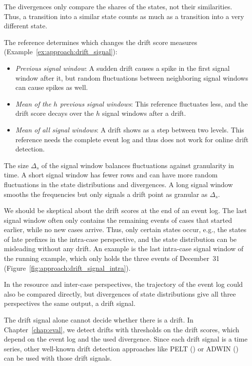 The divergences only compare the shares of the states, not their similarities. Thus, a transition into a similar state counts as much as a transition into a very different state.

The reference determines which changes the drift score measures (Example~\ref{ex:approach:drift_signal}):
\begin{itemize}[beginpenalty=10000]
	\item \emph{Previous signal window}: A sudden drift causes a spike in the first signal window after it, but random fluctuations between neighboring signal windows can cause spikes as well.
	\item \emph{Mean of the $h$ previous signal windows}: This reference fluctuates less, and the drift score decays over the $h$ signal windows after a drift.
	\item \emph{Mean of all signal windows}: A drift shows as a step between two levels. This reference needs the complete event log and thus does not work for online drift detection.
\end{itemize}

The size $\Delta_s$ of the signal window balances fluctuations against granularity in time. A short signal window has fewer rows and can have more random fluctuations in the state distributions and divergences. A long signal window smooths the frequencies but only signals a drift point as granular as $\Delta_s$.

We should be skeptical about the drift scores at the end of an event log. The last signal window often only contains the remaining events of cases that started earlier, while no new cases arrive. Thus, only certain states occur, e.g., the states of late prefixes in the intra-case perspective, and the state distribution can be misleading without any drift. An example is the last intra-case signal window of the running example, which only holds the three events of December~31 (Figure~\ref{fig:approach:drift_signal_intra}).

In the resource and inter-case perspectives, the trajectory of the event log could also be compared directly, but divergences of state distributions give all three perspectives the same output, a drift signal.

The drift signal alone cannot decide whether there is a drift. In Chapter~\ref{chap:eval}, we detect drifts with thresholds on the drift scores, which depend on the event log and the used divergence. Since each drift signal is a time series, other well-known drift detection approaches like PELT (\textcite{adams2023explainable}) or ADWIN (\textcite{baier2020handling}) can be used with those drift signals.

